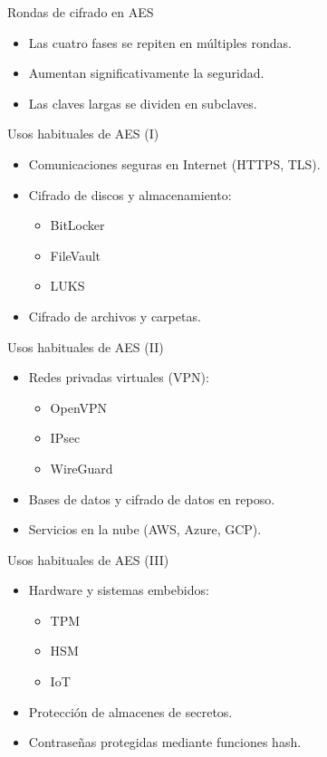 \documentclass{beamer}
\begin{document}
\begin{frame}{Rondas de cifrado en AES}
\begin{itemize}
  \item Las cuatro fases se repiten en múltiples rondas.
  \item Aumentan significativamente la seguridad.
  \item Las claves largas se dividen en subclaves.
\end{itemize}
\end{frame}

\begin{frame}{Usos habituales de AES (I)}
\begin{itemize}
  \item Comunicaciones seguras en Internet (HTTPS, TLS).
  \item Cifrado de discos y almacenamiento:
  \begin{itemize}
    \item BitLocker
    \item FileVault
    \item LUKS
  \end{itemize}
  \item Cifrado de archivos y carpetas.
\end{itemize}
\end{frame}

\begin{frame}{Usos habituales de AES (II)}
\begin{itemize}
  \item Redes privadas virtuales (VPN):
  \begin{itemize}
    \item OpenVPN
    \item IPsec
    \item WireGuard
  \end{itemize}
  \item Bases de datos y cifrado de datos en reposo.
  \item Servicios en la nube (AWS, Azure, GCP).
\end{itemize}
\end{frame}

\begin{frame}{Usos habituales de AES (III)}
\begin{itemize}
  \item Hardware y sistemas embebidos:
  \begin{itemize}
    \item TPM
    \item HSM
    \item IoT
  \end{itemize}
  \item Protección de almacenes de secretos.
  \item Contraseñas protegidas mediante funciones hash.
\end{itemize}
\end{frame}
\end{document}
